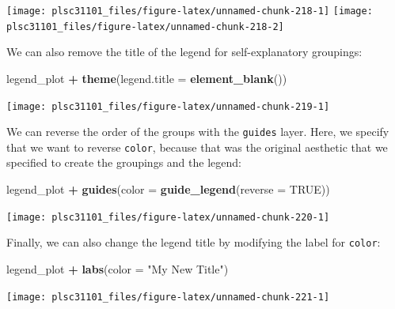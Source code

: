 \documentclass[]{book}
\newenvironment{Shaded}{\begin{snugshade}}{\end{snugshade}}
\newcommand{\KeywordTok}[1]{\textcolor[rgb]{0.13,0.29,0.53}{\textbf{#1}}}
\newcommand{\DataTypeTok}[1]{\textcolor[rgb]{0.13,0.29,0.53}{#1}}
\newcommand{\StringTok}[1]{\textcolor[rgb]{0.31,0.60,0.02}{#1}}
\newcommand{\OtherTok}[1]{\textcolor[rgb]{0.56,0.35,0.01}{#1}}
\newcommand{\OperatorTok}[1]{\textcolor[rgb]{0.81,0.36,0.00}{\textbf{#1}}}
\newcommand{\NormalTok}[1]{#1}
\begin{document}
\begin{center}\texttt{[image: plsc31101\_files/figure-latex/unnamed-chunk-218-1]} \texttt{[image: plsc31101\_files/figure-latex/unnamed-chunk-218-2]} \end{center}

We can also remove the title of the legend for self-explanatory
groupings:

\begin{Shaded}
\begin{Highlighting}[]
\NormalTok{legend_plot }\OperatorTok{+}\StringTok{ }
\StringTok{  }\KeywordTok{theme}\NormalTok{(}\DataTypeTok{legend.title =} \KeywordTok{element_blank}\NormalTok{())}
\end{Highlighting}
\end{Shaded}

\begin{center}\texttt{[image: plsc31101\_files/figure-latex/unnamed-chunk-219-1]} \end{center}

We can reverse the order of the groups with the \texttt{guides} layer.
Here, we specify that we want to reverse \texttt{color}, because that
was the original aesthetic that we specified to create the groupings and
the legend:

\begin{Shaded}
\begin{Highlighting}[]
\NormalTok{legend_plot }\OperatorTok{+}
\StringTok{  }\KeywordTok{guides}\NormalTok{(}\DataTypeTok{color =} \KeywordTok{guide_legend}\NormalTok{(}\DataTypeTok{reverse =} \OtherTok{TRUE}\NormalTok{))}
\end{Highlighting}
\end{Shaded}

\begin{center}\texttt{[image: plsc31101\_files/figure-latex/unnamed-chunk-220-1]} \end{center}

Finally, we can also change the legend title by modifying the label for
\texttt{color}:

\begin{Shaded}
\begin{Highlighting}[]
\NormalTok{legend_plot }\OperatorTok{+}
\StringTok{  }\KeywordTok{labs}\NormalTok{(}\DataTypeTok{color =} \StringTok{"My New Title"}\NormalTok{)}
\end{Highlighting}
\end{Shaded}

\begin{center}\texttt{[image: plsc31101\_files/figure-latex/unnamed-chunk-221-1]} \end{center}
\end{document}
